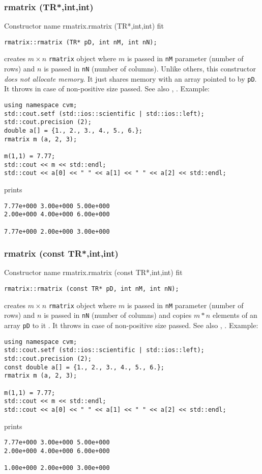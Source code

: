 \subsubsection{rmatrix (TR*,int,int)}
Constructor%
\pdfdest name {rmatrix.rmatrix (TR*,int,int)} fit
\begin{verbatim}
rmatrix::rmatrix (TR* pD, int nM, int nN);
\end{verbatim}
creates  $m\times n$ \verb"rmatrix" object where $m$ is passed in
\verb"nM" parameter (number of rows) and $n$ is passed in
\verb"nN" (number of columns).
Unlike others, this constructor \textit{does not allocate  memory}.
It just shares  memory with an array pointed to by \verb"pD".
It throws  
in case of non-positive size passed.
See also , .
Example:
\begin{Verbatim}
using namespace cvm;
std::cout.setf (std::ios::scientific | std::ios::left);
std::cout.precision (2);
double a[] = {1., 2., 3., 4., 5., 6.};
rmatrix m (a, 2, 3);

m(1,1) = 7.77;
std::cout << m << std::endl;
std::cout << a[0] << " " << a[1] << " " << a[2] << std::endl;
\end{Verbatim}
prints
\begin{Verbatim}
7.77e+000 3.00e+000 5.00e+000
2.00e+000 4.00e+000 6.00e+000

7.77e+000 2.00e+000 3.00e+000
\end{Verbatim}
\newpage


\subsubsection{rmatrix (const TR*,int,int)}
Constructor%
\pdfdest name {rmatrix.rmatrix (const TR*,int,int)} fit
\begin{verbatim}
rmatrix::rmatrix (const TR* pD, int nM, int nN);
\end{verbatim}
creates  $m\times n$ \verb"rmatrix" object where $m$ is passed in
\verb"nM" parameter (number of rows) and $n$ is passed in
\verb"nN" (number of columns)
and copies $m*n$ elements of an array  \verb"pD" to it .
It throws  
in case of non-positive size passed.
See also , .
Example:
\begin{Verbatim}
using namespace cvm;
std::cout.setf (std::ios::scientific | std::ios::left);
std::cout.precision (2);
const double a[] = {1., 2., 3., 4., 5., 6.};
rmatrix m (a, 2, 3);

m(1,1) = 7.77;
std::cout << m << std::endl;
std::cout << a[0] << " " << a[1] << " " << a[2] << std::endl;
\end{Verbatim}
prints
\begin{Verbatim}
7.77e+000 3.00e+000 5.00e+000
2.00e+000 4.00e+000 6.00e+000

1.00e+000 2.00e+000 3.00e+000
\end{Verbatim}
\newpage



